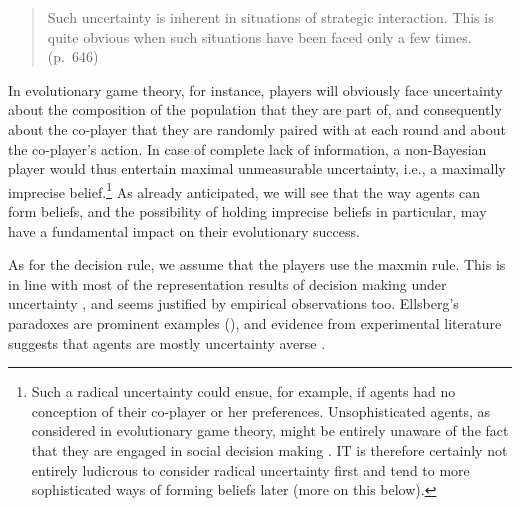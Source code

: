 \documentclass[fleqn,reqno,12pt]{article}
\theoremstyle{Satz}
\theoremstyle{Bsp}
\begin{document}
\begin{quote}
  Such uncertainty is inherent in situations of strategic interaction. This is quite obvious
  when such situations have been faced only a few times. (p.~646)
\end{quote}

\noindent In evolutionary game theory, for instance, players will obviously face uncertainty
about the composition of the population that they are part of, and consequently about the
co-player that they are randomly paired with at each round and about the co-player's action. In
case of complete lack of information, a non-Bayesian player would thus entertain maximal
unmeasurable uncertainty, i.e., a maximally imprecise belief.\footnote{Such a radical
  uncertainty could ensue, for example, if agents had no conception of their co-player or her
  preferences. Unsophisticated agents, as considered in evolutionary game theory, might be
  entirely unaware of the fact that they are engaged in social decision making \cite[e.g.,][for
  game theoretic models of unawareness]{HeifetzMeier2009:Dynamic-Unaware}. IT is therefore
  certainly not entirely ludicrous to consider radical uncertainty first and tend to more
  sophisticated ways of forming beliefs later (more on this below).} As already anticipated, we
will see that the way agents can form beliefs, and the possibility of holding imprecise beliefs
in particular, may have a fundamental impact on their evolutionary success.

As for the decision rule, we assume that the players use the maxmin rule. This is in line with most of the representation
results of decision making under uncertainty \citep[e.g.,][]{gilsch89,KlibMarMuk05,GhirMar02},
and seems justified by empirical observations too. Ellsberg's paradoxes are prominent examples (\citet{ells61}), and evidence from experimental literature suggests that agents are mostly uncertainty averse \citep[e.g.,][]{TrautKuil16}.
\end{document}
